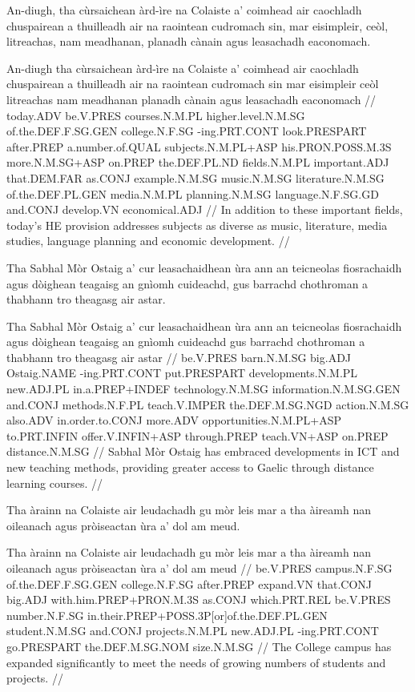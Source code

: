 \documentclass[a4paper,10pt]{article}
\begin{document}
\ex
\begingl
\glpre An-diugh, tha cùrsaichean àrd-ìre na Colaiste a' coimhead air caochladh chuspairean a thuilleadh air na raointean cudromach sin, mar eisimpleir, ceòl, litreachas, nam meadhanan, planadh cànain agus leasachadh eaconomach. 

\vspace{4mm}
\gla An-diugh tha cùrsaichean àrd-ìre na Colaiste a' coimhead air caochladh chuspairean a thuilleadh air na raointean cudromach sin mar eisimpleir ceòl litreachas nam meadhanan planadh cànain agus leasachadh eaconomach  //
\glb today.ADV be.V.PRES courses.N.M.PL higher.level.N.M.SG of.the.DEF.F.SG.GEN college.N.F.SG -ing.PRT.CONT look.PRESPART after.PREP a.number.of.QUAL subjects.N.M.PL+ASP his.PRON.POSS.M.3S more.N.M.SG+ASP on.PREP the.DEF.PL.ND fields.N.M.PL important.ADJ that.DEM.FAR as.CONJ example.N.M.SG music.N.M.SG literature.N.M.SG of.the.DEF.PL.GEN media.N.M.PL planning.N.M.SG language.N.F.SG.GD and.CONJ develop.VN economical.ADJ  //
\glft In addition to these important fields, today's HE provision addresses subjects as diverse as music, literature, media studies, language planning and economic development. //
\endgl
\xe

\ex
\begingl
\glpre Tha Sabhal Mòr Ostaig a' cur leasachaidhean ùra ann an teicneolas fiosrachaidh agus dòighean teagaisg an gnìomh cuideachd, gus barrachd chothroman a thabhann tro theagasg air astar. 

\vspace{4mm}
\gla Tha Sabhal Mòr Ostaig a' cur leasachaidhean ùra {ann an} teicneolas fiosrachaidh agus dòighean teagaisg an gnìomh cuideachd gus barrachd chothroman a thabhann tro theagasg air astar  //
\glb be.V.PRES barn.N.M.SG big.ADJ Ostaig.NAME -ing.PRT.CONT put.PRESPART developments.N.M.PL new.ADJ.PL in.a.PREP+INDEF technology.N.M.SG information.N.M.SG.GEN and.CONJ methods.N.F.PL teach.V.IMPER the.DEF.M.SG.NGD action.N.M.SG also.ADV in.order.to.CONJ more.ADV opportunities.N.M.PL+ASP to.PRT.INFIN offer.V.INFIN+ASP through.PREP teach.VN+ASP on.PREP distance.N.M.SG  //
\glft Sabhal Mòr Ostaig has embraced developments in ICT and new teaching methods, providing greater access to Gaelic through distance learning courses. //
\endgl
\xe

\ex
\begingl
\glpre Tha àrainn na Colaiste air leudachadh gu mòr leis mar a tha àireamh nan oileanach agus pròiseactan ùra a' dol am meud. 

\vspace{4mm}
\gla Tha àrainn na Colaiste air leudachadh gu mòr leis mar a tha àireamh nan oileanach agus pròiseactan ùra a' dol am meud  //
\glb be.V.PRES campus.N.F.SG of.the.DEF.F.SG.GEN college.N.F.SG after.PREP expand.VN that.CONJ big.ADJ with.him.PREP+PRON.M.3S as.CONJ which.PRT.REL be.V.PRES number.N.F.SG in.their.PREP+POSS.3P[or]of.the.DEF.PL.GEN student.N.M.SG and.CONJ projects.N.M.PL new.ADJ.PL -ing.PRT.CONT go.PRESPART the.DEF.M.SG.NOM size.N.M.SG  //
\glft The College campus has expanded significantly to meet the needs of growing numbers of students and projects. //
\endgl
\xe
\end{document}
